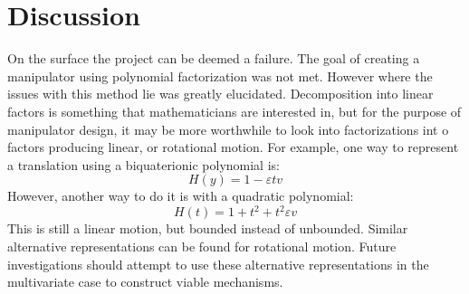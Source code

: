 \section{Discussion}
On the surface the project can be deemed a failure. The goal of creating a manipulator using polynomial factorization was not met. However where the 
issues with this method lie was greatly elucidated. Decomposition into
linear factors is something that mathematicians are interested in, but 
for the purpose of manipulator design, it may be more worthwhile to look
into factorizations int o factors producing linear, or rotational motion. 
For example, one way to represent a translation using a biquaterionic polynomial is:
\begin{equation}
    H(y) = 1 - \varepsilon t v
\end{equation}
However, another way to do it is with a quadratic polynomial:
\begin{equation}
    H(t) = 1 +t^2 + t^{2} \varepsilon v
\end{equation}
This is still a linear motion, but bounded instead of unbounded. 
Similar alternative representations can be found for rotational motion.
Future investigations should attempt to use these alternative representations in the multivariate case to construct viable mechanisms.
